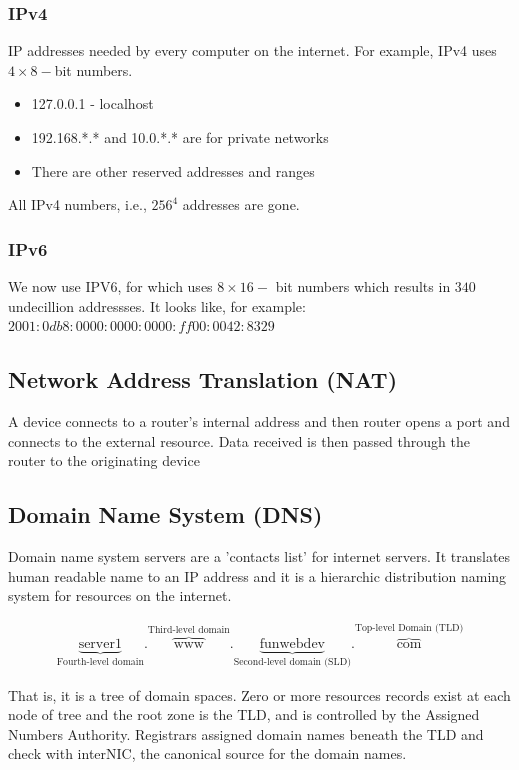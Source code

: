 \documentclass[a4paper]{article}
\theoremstyle{plain}
\theoremstyle{definition}
\newtheorem{exmp}{Example}[section]
\theoremstyle{remark}
\begin{document}
\begin{flushleft}
\subsubsection{IPv4}

IP addresses needed by every computer on the internet. For example, IPv4 uses $4\times 8-$bit numbers.
\begin{itemize}
	\item 127.0.0.1 - localhost
	\item 192.168.*.* and 10.0.*.* are for private networks
	\item There are other reserved addresses and ranges
\end{itemize}
All IPv4 numbers, i.e., $256^{4}$ addresses are gone.
\subsubsection{IPv6}
We now use IPV6, for which uses $8\times 16-$ bit numbers which results in $340$ undecillion addressses. It looks like, for example:
$2001:0db8:0000:0000:0000:ff00:0042:8329$
\subsection{Network Address Translation (NAT)}
A device connects to a router's internal address and then router opens a port and connects to the external resource. Data received is then passed through the router to the originating device
\subsection{Domain Name System (DNS)}
Domain name system servers are a 'contacts list' for internet servers. It translates human readable name to an IP address and it is a hierarchic distribution naming system for resources on the internet.
\begin{tcolorbox}[colback=black!3!white,colframe=black!60!white,title=\begin{exmp}Domain Namespace \label{Domain Namespace}\end{exmp}]
        
                \begin{align}
       \underbrace{\text{server1}}_{\text{Fourth-level domain}}.\overbrace{\text{www}}^{\text{Third-level domain}}.\underbrace{\text{funwebdev}}_{\text{Second-level domain (SLD)}}.\overbrace{\text{com}}^{\text{Top-level Domain (TLD)}}
                \end{align}
\end{tcolorbox}
That is, it is a tree of domain spaces. Zero or more resources records exist at each node of tree and the root zone is the TLD, and is controlled by the Assigned Numbers Authority. Registrars assigned domain names beneath the TLD and check with interNIC, the canonical source for the domain names. 

\end{flushleft}
\end{document}
